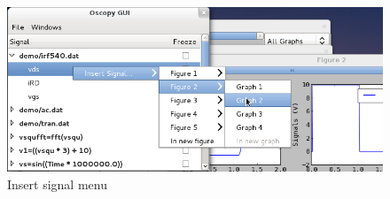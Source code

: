 \documentclass[a4paper,11pt]{report}
\begin{document}
\begin{figure}[htbp]
  \begin{minipage}{0.95\linewidth}
    \includegraphics[scale=.5]{../png/ioscopy-insert.png}
    \caption{Insert signal menu}
    \label{fig:insert}
  \end{minipage}

\end{figure}
\end{document}
